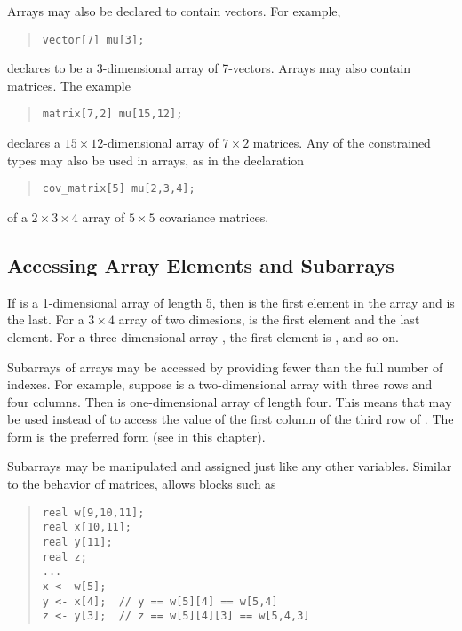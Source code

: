 Arrays may also be declared to contain vectors.  For example,
%
\begin{quote}
\begin{Verbatim}  
vector[7] mu[3];
\end{Verbatim}
\end{quote}
% 
declares  to be a 3-dimensional array of 7-vectors.  
Arrays may also contain matrices.  The example
%
\begin{quote}
\begin{Verbatim} 
matrix[7,2] mu[15,12];
\end{Verbatim}
\end{quote}
%
declares a $15 \times 12$-dimensional array of $7 \times 2$ matrices.
Any of the constrained types may also be used in arrays, as in the
declaration
%
\begin{quote}
\begin{Verbatim}  
cov_matrix[5] mu[2,3,4];
\end{Verbatim}
\end{quote}
% 
of a $2 \times 3 \times 4$ array of $5 \times 5$ covariance matrices.

\subsection{Accessing Array Elements and Subarrays}

If  is a 1-dimensional array of length 5, then  is
the first element in the array and  is the last.  For a $3
\times 4$ array  of two dimesions,  is the first
element and  the last element.  For a three-dimensional
array , the first element is , and so on.

Subarrays of arrays may be accessed by providing fewer than the full
number of indexes.  For example, suppose  is a two-dimensional
array with three rows and four columns.  Then  is
one-dimensional array of length four.  This means that 
may be used instead of  to access the value of the first
column of the third row of .  The form  is the
preferred form (see  in this chapter).

Subarrays may be manipulated and assigned just like any other
variables.  Similar to the behavior of matrices, \Stan allows blocks
such as 
%
\begin{quote}
\begin{Verbatim} 
real w[9,10,11];
real x[10,11];
real y[11];
real z;
...
x <- w[5];
y <- x[4];  // y == w[5][4] == w[5,4]
z <- y[3];  // z == w[5][4][3] == w[5,4,3]
\end{Verbatim}
\end{quote}
%

